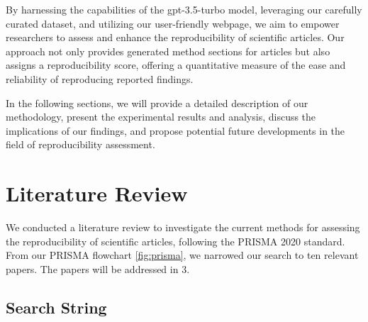\documentclass[12pt, a4paper, twocolumn]{article}
\begin{document}
	By harnessing the capabilities of the gpt-3.5-turbo model, leveraging our carefully curated dataset, and utilizing our user-friendly webpage, we aim to empower researchers to assess and enhance the reproducibility of scientific articles. Our approach not only provides generated method sections for articles but also assigns a reproducibility score, offering a quantitative measure of the ease and reliability of reproducing reported findings.
	
	In the following sections, we will provide a detailed description of our methodology, present the experimental results and analysis, discuss the implications of our findings, and propose potential future developments in the field of reproducibility assessment.
		

	\section{Literature Review}
	
	We conducted a literature review to investigate the current methods for assessing the reproducibility of scientific articles, following the PRISMA 2020 standard. From our PRISMA flowchart \ref{fig:prisma}, we narrowed our search to ten relevant papers. The papers will be addressed in 3.

	\subsection{Search String}
\end{document}
